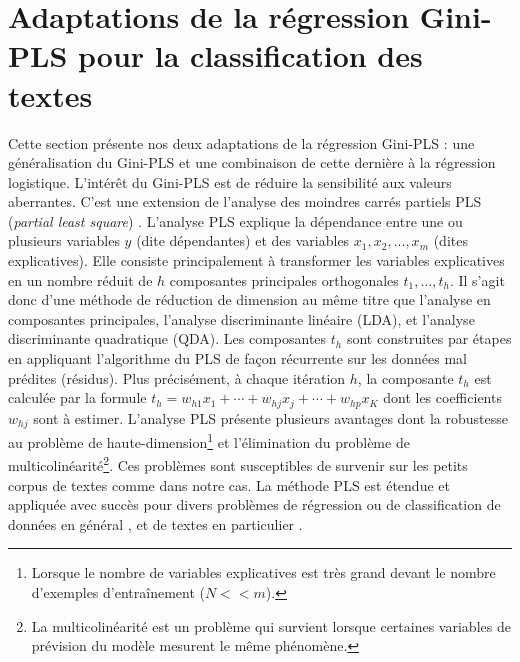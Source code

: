 \section{Adaptations de la régression Gini-PLS pour la classification des textes}
\label{sec:sensresultat:pls}
Cette section présente nos deux adaptations de la régression Gini-PLS \citep{mussard2018ginipls} : une généralisation du Gini-PLS et une combinaison de cette dernière à la régression logistique. L'intérêt du Gini-PLS est de réduire la sensibilité aux valeurs aberrantes. C'est une extension de l'analyse des moindres carrés partiels PLS (\textit{partial least square}) \citep{wold1966pls}. L'analyse PLS explique la dépendance entre une ou plusieurs variables $y$ (dite dépendantes) et des variables $x_1,x_2,...,x_m$ (dites explicatives). Elle consiste principalement à transformer les variables explicatives en un nombre réduit de $h$ composantes principales orthogonales $t_1, ..., t_h$. Il s'agit donc d'une méthode de réduction de dimension au même titre que l'analyse en composantes principales, l'analyse discriminante linéaire (LDA), et l'analyse discriminante quadratique (QDA). Les composantes $t_h$ sont construites par étapes en appliquant l'algorithme du PLS de façon récurrente sur les données mal prédites (résidus). Plus précisément, à chaque itération $h$, la composante $t_h$ est calculée par la formule $t_h = w_{h1} x_1 + \cdots + w_{hj} x_j + \cdots + w_{hp} x_K$ dont les coefficients $w_{hj}$ sont à estimer. L'analyse PLS présente plusieurs avantages \citep{lacroux2011avantagesPLS} dont la robustesse au problème de haute-dimension\footnote{Lorsque le nombre de variables explicatives est très grand devant le nombre d'exemples d'entraînement ($N << m$).} et l'élimination du problème de multicolinéarité\footnote{La multicolinéarité est un problème qui survient lorsque certaines variables de prévision du modèle mesurent le même phénomène.}\citep{kroll2013impactOfMulticollinearity-PLS}. Ces problèmes sont susceptibles de survenir sur les petits corpus de textes comme dans notre cas.  La méthode PLS est étendue et appliquée avec succès pour divers problèmes de régression \citep{lacroux2011avantagesPLS}
 ou de classification de données en général \citep{liu2007pls4classif,durif2017sparsePLSandLogit, bazzoli2018classificationwithLS-PLS}, et de textes en particulier \citep{zeng2007textclassPLS}.


